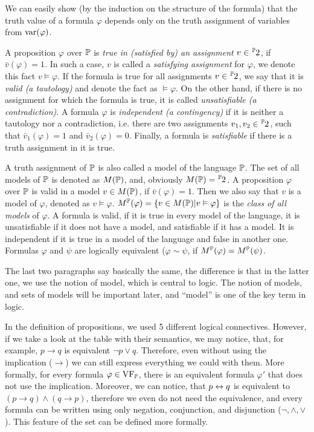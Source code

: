 We can easily show (by the induction on the structure of the formula) that the truth value of a formula $\varphi$ depends only on the truth assignment of variables from $\operatorname{var}(\varphi)$.

A proposition $\varphi$ over $\mathbb{P}$ is \emph{true in (satisfied by) an assignment} $v\in \fset{\Prop}{2}$, if $\bar{v}(\varphi) = 1$. In such a case, $v$ is called a \emph{satisfying assignment} for $\varphi$, we denote this fact $v \vDash \varphi$. If the formula is true for all assignments $v \in \fset{\Prop}{2}$, we say that it is \emph{valid (a tautology)} and denote the fact as $\vDash \varphi$. On the other hand, if there is no assignment for which the formula is true, it is called \emph{unsatisfiable (a contradiction)}. A formula $\varphi$ is \emph{independent (a contingency)} if it is neither a tautology nor a contradiction, i.e. there are two assignments $v_1, v_2 \in \fset{\Prop}{2}$, such that $\bar{v}_1(\varphi) = 1$ and $\bar{v}_2(\varphi) = 0$. Finally, a formula is \emph{satisfiable} if there is a truth assignment in it is true.

A truth assignment of $\mathbb{P}$ is also called a model of the language $\mathbb{P}$. The set of all models of $\mathbb{P}$ is denoted as $M(\mathbb{P})$, and, obviously $M(\Prop) = \fset{\Prop}{2}$. A proposition $\varphi$ over $\mathbb{P}$ is valid in a model $v \in M(\mathbb{P})$, if $\bar{v}(\varphi) = 1$. Then we also say that $v$ is a model of $\varphi$, denoted as $v \vDash \varphi$. $M^\mathbb{P}(\varphi) = \{v \in M(\mathbb{P}) | v \vDash \varphi\}$ is the \emph{class of all models} of $\varphi$. A formula is valid, if it is true in every model of the language, it is unsatisfiable if it does not have a model, and satisfiable if it has a model. It is independent if it is true in a model of the language and false in another one. Formulas $\varphi$ and $\psi$ are logically equivalent ($\varphi \sim \psi$, if $M^\mathbb{P}(\varphi) = M^\mathbb{P}(\psi)$.

The last two paragraphs say basically the same, the difference is that in the latter one, we use the notion of model, which is central to logic. The notion of models, and sets of models will be important later, and ``model'' is one of the key term in logic.

In the definition of propositions, we used 5 different logical connectives. However, if we take a look at the table with their semantics, we may notice, that, for example, $p \to q$ is equivalent $\neg p \lor q$. Therefore, even without using the implication ($\to$) we can still express everything we could with them. More formally, for every formula $\varphi \in \operatorname{VF}_\mathbb{P}$, there is an equivalent formula $\varphi'$ that does not use the implication. Moreover, we can notice, that $p \leftrightarrow q$ is equivalent to $(p \to q) \land (q \to p)$, therefore we even do not need the equivalence, and every formula can be written using only negation, conjunction, and disjunction ($\neg, \land, \lor$). This feature of the set can be defined more formally.

